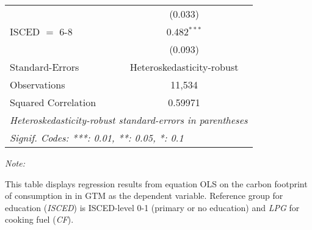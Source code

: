 \begin{table}[htbp!]
\begin{adjustbox}{width = 1\textwidth, max height = 0.95\textheight, center}
\begin{threeparttable}[b]
\begin{tabular}{lc}
                                & (0.033)\\   
            ISCED $=$ 6-8       & 0.482$^{***}$\\   
                                & (0.093)\\   
            \midrule 
            Standard-Errors     & Heteroskedasticity-robust \\   
            Observations        & 11,534\\  
            Squared Correlation & 0.59971\\  
            \midrule \midrule
            \multicolumn{2}{l}{\emph{Heteroskedasticity-robust standard-errors in parentheses}}\\
            \multicolumn{2}{l}{\emph{Signif. Codes: ***: 0.01, **: 0.05, *: 0.1}}\\
         \end{tabular}
         
         \begin{tablenotes}\item \medskip \textit{Note:}
            \item This table displays regression results from equation OLS on the carbon footprint of consumption in  in GTM as the dependent variable.  Reference group for education (\textit{ISCED}) is ISCED-level 0-1 (primary or no education) and \textit{LPG} for cooking fuel (\textit{CF}).
         \end{tablenotes}
      \end{threeparttable}
   \end{adjustbox}
\end{table}



